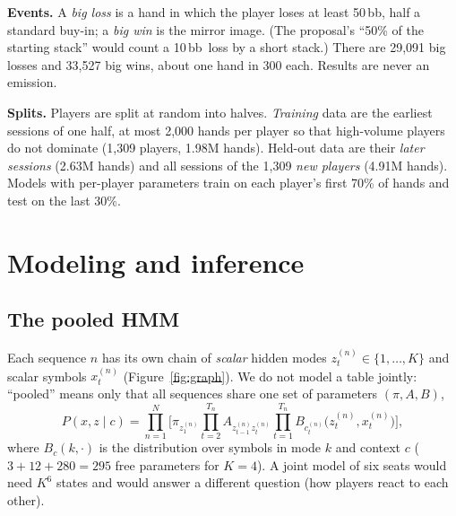 \documentclass{article}
\newcommand{\bb}{\,bb}
\begin{document}
\textbf{Events.} A \emph{big loss} is a hand in which the player loses at least 50\bb, half a standard buy-in; a \emph{big win} is the mirror image. (The proposal's ``50\% of the starting stack'' would count a 10\bb\ loss by a short stack.) There are 29{,}091 big losses and 33{,}527 big wins, about one hand in 300 each. Results are never an emission.

\textbf{Splits.} Players are split at random into halves. \emph{Training} data are the earliest sessions of one half, at most 2{,}000 hands per player so that high-volume players do not dominate (1{,}309 players, 1.98M hands). Held-out data are their \emph{later sessions} (2.63M hands) and all sessions of the 1{,}309 \emph{new players} (4.91M hands). Models with per-player parameters train on each player's first 70\% of hands and test on the last 30\%.

\section{Modeling and inference}
\subsection{The pooled HMM}
Each sequence $n$ has its own chain of \emph{scalar} hidden modes $z^{(n)}_t\in\{1,\dots,K\}$ and scalar symbols $x^{(n)}_t$ (Figure~\ref{fig:graph}). We do not model a table jointly: ``pooled'' means only that all sequences share one set of parameters $(\pi,A,B)$,
\begin{equation}
P(x,z\mid c)=\prod_{n=1}^{N}\Big[\pi_{z^{(n)}_1}\prod_{t=2}^{T_n}A_{z^{(n)}_{t-1}z^{(n)}_t}\prod_{t=1}^{T_n}B_{c^{(n)}_t}\big(z^{(n)}_t,x^{(n)}_t\big)\Big],
\label{eq:joint}
\end{equation}
where $B_c(k,\cdot)$ is the distribution over symbols in mode $k$ and context $c$ ($3+12+280=295$ free parameters for $K=4$). A joint model of six seats would need $K^6$ states and would answer a different question (how players react to each other).
\end{document}
